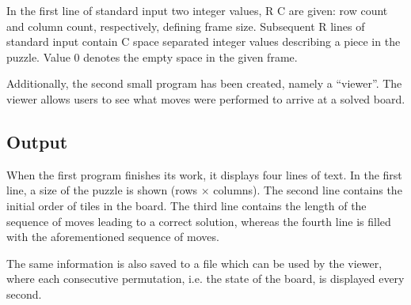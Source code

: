 \documentclass[12pt]{article}
\begin{document}
In the first line of standard input two integer values, R C are given: row count and column count, respectively, defining frame size. Subsequent R lines of standard input contain C space separated integer values describing a piece in the puzzle. Value 0 denotes the empty space in the given frame.

Additionally, the second small program has been created, namely a ``viewer''. The viewer allows users to see what moves were performed to arrive at a solved board.

\subsection{Output}

When the first program finishes its work, it displays four lines of text. In the first line, a size of the puzzle is shown (rows $\times$ columns). The second line contains the initial order of tiles in the board. The third line contains the length of the sequence of moves leading to a correct solution, whereas the fourth line is filled with the aforementioned sequence of moves.

The same information is also saved to a file which can be used by the viewer, where each consecutive permutation, i.e. the state of the board, is displayed every second.

\newpage
\listoffigures
\newpage
\printbibliography
\end{document}
